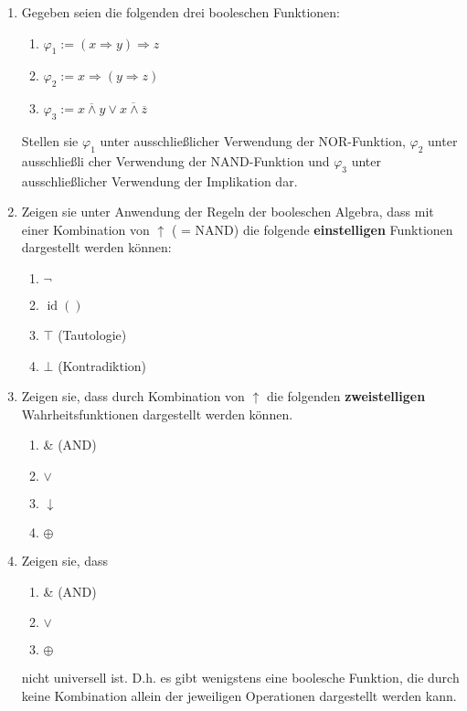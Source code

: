 \documentclass[paper=a4,fontsize=11pt]{scrartcl}%
\numberwithin{equation}{section}
\DeclareMathOperator{\id}{id}
\begin{document}
\begin{enumerate}
\begin{enumerate}
	\end{enumerate}
	\item Gegeben seien die folgenden drei booleschen Funktionen:
	\begin{enumerate}
		\item $\varphi_1 := (x \Rightarrow y) \Rightarrow z$
		\item $\varphi_2 := x \Rightarrow (y \Rightarrow z)$
		\item $\varphi_3 := \overline{x \land y} \lor \overline{x \land \overline{z}}$
	\end{enumerate}
	Stellen sie $\varphi_1$ unter ausschließlicher Verwendung der NOR-Funktion, $\varphi_2$ unter ausschließli
cher Verwendung der NAND-Funktion und $\varphi_3$ unter ausschließlicher Verwendung der Implikation dar.
	\item Zeigen sie unter Anwendung der Regeln der booleschen Algebra, dass mit einer Kombination von $\uparrow$ ( = NAND) die folgende \textbf{einstelligen} Funktionen dargestellt werden können:
	\begin{enumerate}
		\item $\neg $
		\item $ \id()$
		\item $\top$ (Tautologie)
		\item $\bot$ (Kontradiktion)
	\end{enumerate}
	\item Zeigen sie, dass durch Kombination von $ \uparrow$ die folgenden \textbf{zweistelligen} Wahrheitsfunktionen dargestellt werden können.
	\begin{enumerate}
		\item \& (AND)
		\item $\lor$
		\item $\downarrow$
		\item $\oplus$
	\end{enumerate}
	\item Zeigen sie, dass 
	\begin{enumerate}
		\item \& (AND)
		\item $\lor$
		\item $\oplus$
	\end{enumerate}
	nicht universell ist. D.h. es gibt wenigstens eine boolesche Funktion, die durch keine Kombination allein der jeweiligen Operationen dargestellt werden kann. 
\end{enumerate}
	
\end{document}
